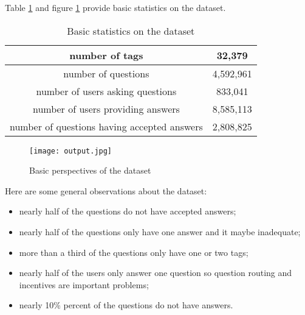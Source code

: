{{{{{{{Table \ref{tab:basicinfo} and figure \ref{fig:basicstat} provide basic statistics on the dataset.
\begin{table}[htp]
\caption{Basic statistics on the dataset}
\label{tab:basicinfo}
\centering
\begin{tabular}{|c|c|}
\hline
number of tags & 32,379\\ \hline
number of questions & 4,592,961 \\ \hline
number of users asking questions & 833,041 \\ \hline
number of users providing answers & 8,585,113\\ \hline
number of questions having accepted answers & 2,808,825\\ \hline

\end{tabular}
\end{table}

\begin{figure}
\centering
\texttt{[image: output.jpg]}  
\caption{Basic perspectives of the dataset}
\label{fig:basicstat} 
\end{figure}




Here are some general observations about the dataset: 
\begin{itemize}
    \item nearly half of the questions do not have accepted answers;
    \item nearly half of the questions only have one answer and it maybe inadequate;
    \item more than a third of the questions only have one or two tags;
    \item nearly half of the users only answer one question so question routing and incentives are important problems;
    \item nearly 10\% percent of the questions do not have answers.
\end{itemize}



}}}}}}}
